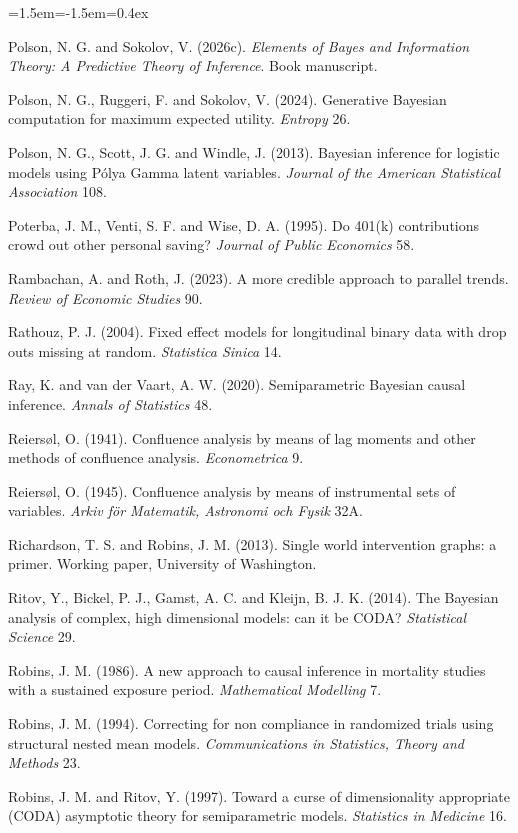 \begin{list}{}{\leftmargin=1.5em\itemindent=-1.5em\itemsep=0.4ex}
\item Polson, N. G. and Sokolov, V. (2026c). \emph{Elements of Bayes and Information Theory: A Predictive Theory of Inference}. Book manuscript.
\item Polson, N. G., Ruggeri, F. and Sokolov, V. (2024). Generative Bayesian computation for maximum expected utility. \emph{Entropy} 26.
\item Polson, N. G., Scott, J. G. and Windle, J. (2013). Bayesian inference for logistic models using P\'olya Gamma latent variables. \emph{Journal of the American Statistical Association} 108.
\item Poterba, J. M., Venti, S. F. and Wise, D. A. (1995). Do 401(k) contributions crowd out other personal saving? \emph{Journal of Public Economics} 58.
\item Rambachan, A. and Roth, J. (2023). A more credible approach to parallel trends. \emph{Review of Economic Studies} 90.
\item Rathouz, P. J. (2004). Fixed effect models for longitudinal binary data with drop outs missing at random. \emph{Statistica Sinica} 14.
\item Ray, K. and van der Vaart, A. W. (2020). Semiparametric Bayesian causal inference. \emph{Annals of Statistics} 48.
\item Reiers\o l, O. (1941). Confluence analysis by means of lag moments and other methods of confluence analysis. \emph{Econometrica} 9.
\item Reiers\o l, O. (1945). Confluence analysis by means of instrumental sets of variables. \emph{Arkiv f\"or Matematik, Astronomi och Fysik} 32A.
\item Richardson, T. S. and Robins, J. M. (2013). Single world intervention graphs: a primer. Working paper, University of Washington.
\item Ritov, Y., Bickel, P. J., Gamst, A. C. and Kleijn, B. J. K. (2014). The Bayesian analysis of complex, high dimensional models: can it be CODA? \emph{Statistical Science} 29.
\item Robins, J. M. (1986). A new approach to causal inference in mortality studies with a sustained exposure period. \emph{Mathematical Modelling} 7.
\item Robins, J. M. (1994). Correcting for non compliance in randomized trials using structural nested mean models. \emph{Communications in Statistics, Theory and Methods} 23.
\item Robins, J. M. and Ritov, Y. (1997). Toward a curse of dimensionality appropriate (CODA) asymptotic theory for semiparametric models. \emph{Statistics in Medicine} 16.

\end{list}
